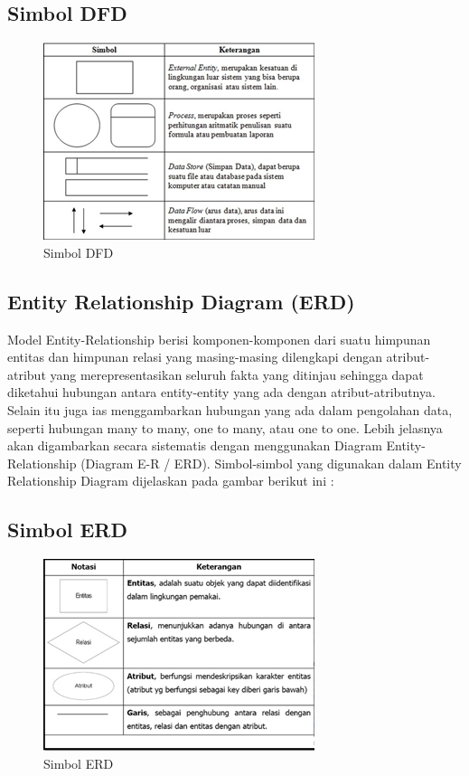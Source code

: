 \documentclass{jtetiproposalskripsi}
\begin{document}
\subsection{Simbol DFD}
 \begin{figure}[ht!]
  \centering
    \includegraphics{gambar/cew}
    \caption{Simbol DFD}
    \label{cew}
\end{figure}



\subsection{ Entity Relationship Diagram (ERD)}
	Model Entity-Relationship berisi komponen-komponen dari suatu himpunan entitas dan himpunan relasi yang masing-masing dilengkapi dengan atribut-atribut yang merepresentasikan seluruh fakta yang ditinjau sehingga dapat diketahui hubungan antara entity-entity yang ada dengan atribut-atributnya. Selain itu juga  ias menggambarkan hubungan yang ada dalam pengolahan data, seperti hubungan many to many, one to many, atau one to one. Lebih jelasnya akan digambarkan secara sistematis dengan menggunakan Diagram Entity-Relationship (Diagram E-R / ERD).
Simbol-simbol yang digunakan dalam Entity Relationship Diagram dijelaskan pada gambar berikut ini :

\subsection{Simbol ERD}
 \begin{figure}[ht!]
  \centering
    \includegraphics{gambar/erd}
    \caption{Simbol ERD}
    \label{erd}
\end{figure}
\end{document}
